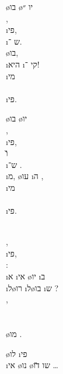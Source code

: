 \o{בו} \o{יו} ״\\
 ,\\
  \i{פי},\\
 \i{ש} ־.\\
 \o{בו},\\
\i{היא} \i{קי} ־!\\
\i{מי}\\
\\
\i{פי}.

\o{בו} \o{יו} \\
 ,\\
  \i{פי},\\
 \u{ו} \\
\i{ש}־ .\\
 \i{מ}, \o{עו}  \i{ה} ,\\
\i{מי}\\
\\
\i{פי}.

 \\
 ,\\
    \i{פי},\\
 :\\
\i{א} \i{אי} \o{יו}  \i{ב}\\
\i{ל}\o{רו}\gnuva {} \i{ל}\o{בו}  \i{ש} ?\\
 ,\\
\\
\\
 \o{מו} .

 \o{לו}  \i{פי}\\
\i{אי} \o{נו} \o{שו} \u{דו} …
